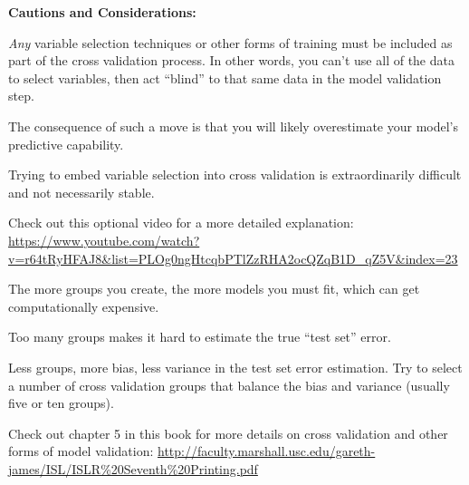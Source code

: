 \documentclass[12pt]{notes}
\begin{document}
\nspace
\textbf{Cautions and Considerations:}
\bi
\item \textit{Any} variable selection techniques or other forms of training must be included as part of the cross validation process. In other words, you can't use all of the data to select variables, then act ``blind'' to that same data in the model validation step. 
\bi
\item The consequence of such a move is that you will likely overestimate your model's predictive capability. 
\item Trying to embed variable selection into cross validation is extraordinarily difficult and not necessarily stable. 
\item Check out this optional video for a more detailed explanation: \url{https://www.youtube.com/watch?v=r64tRyHFAJ8&list=PLOg0ngHtcqbPTlZzRHA2ocQZqB1D_qZ5V&index=23}
\ei
\item The more groups you create, the more models you must fit, which can get computationally expensive. 
\item Too many groups makes it hard to estimate the true ``test set'' error. 
\bi
\item Less groups, more bias, less variance in the test set error estimation. Try to select a number of cross validation groups that balance the bias and variance (usually five or ten groups). 
\ei
\item Check out chapter 5 in this book for more details on cross validation and other forms of model validation: 
\url{http://faculty.marshall.usc.edu/gareth-james/ISL/ISLR\%20Seventh\%20Printing.pdf}
\ei













\end{document}
